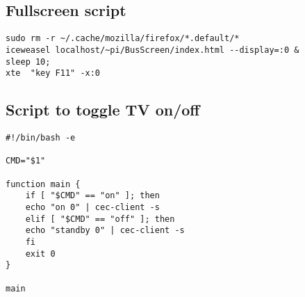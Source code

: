 \documentclass{article}
\begin{document}
\subsection{Fullscreen script}
\begin{verbatim}
sudo rm -r ~/.cache/mozilla/firefox/*.default/*
iceweasel localhost/~pi/BusScreen/index.html --display=:0 &
sleep 10;
xte  "key F11" -x:0
\end{verbatim}
\subsection{Script to toggle TV on/off}
\begin{verbatim}
#!/bin/bash -e

CMD="$1"

function main {
    if [ "$CMD" == "on" ]; then
	echo "on 0" | cec-client -s 
    elif [ "$CMD" == "off" ]; then
	echo "standby 0" | cec-client -s
    fi
    exit 0
}

main
\end{verbatim}
\end{document}
